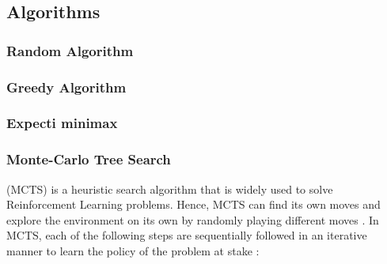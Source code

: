 \documentclass{svproc}
\begin{document}
    \subsection{Algorithms}
    	\subsubsection{Random Algorithm}
    
    	\subsubsection{Greedy Algorithm}
    
	\subsubsection{Expecti minimax}    
    
    	\subsubsection{Monte-Carlo Tree Search}
    	
    	(MCTS) is a heuristic search algorithm that is widely used to solve Reinforcement Learning problems. Hence, MCTS can find its own moves and explore the environment on its own by randomly playing different moves \cite{mcts_comparison}. In MCTS, each of the following steps are sequentially followed in an iterative manner to learn the policy of the problem at stake \cite{mcts_medium}:
	
\end{document}
